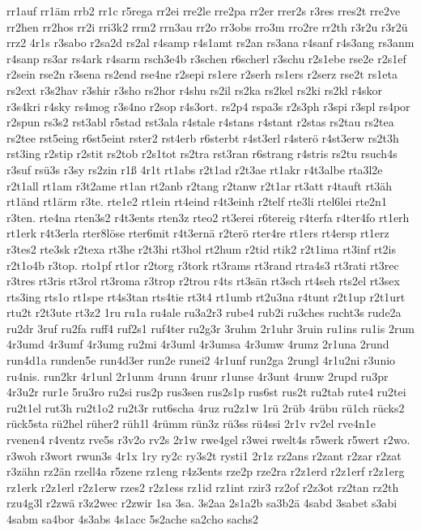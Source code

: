 {rr1auf
rr1äm
rrb2
rr1c
r5rega
rr2ei
rre2le
rre2pa
rr2er
rrer2s
r3res
rres2t
rre2ve
rr2hen
rr2hos
rr2i
rri3k2
rrm2
rrn3au
rr2o
rr3obs
rro3m
rro2re
rr2th
r3r2u
r3r2ü
rrz2
4r1s
r3sabo
r2sa2d
rs2al
r4samp
r4s1amt
rs2an
rs3ana
r4sanf
r4s3ang
rs3anm
r4sanp
rs3ar
rs4ark
r4sarm
rsch3e4b
r3schen
r6scherl
r3schu
r2s1ebe
rse2e
r2s1ef
r2sein
rse2n
r3sena
rs2end
rse4ne
r2sepi
rs1ere
r2serh
rs1ers
r2serz
rse2t
rs1eta
rs2ext
r3s2hav
r3shir
r3sho
rs2hor
r4shu
rs2il
rs2ka
rs2kel
rs2ki
rs2kl
r4skor
r3s4kri
r4sky
rs4mog
r3s4no
r2sop
r4s3ort.
rs2p4
rspa3s
r2s3ph
r3spi
r3spl
rs4por
r2spun
rs3s2
rst3abl
r5stad
rst3ala
r4stale
r4stans
r4stant
r2stas
rs2tau
rs2tea
rs2tee
rst5eing
r6st5eint
rster2
rst4erb
r6sterbt
r4st3erl
r4sterö
r4st3erw
rs2t3h
rst3ing
r2stip
r2stit
rs2tob
r2s1tot
rs2tra
rst3ran
r6strang
r4stris
rs2tu
rsuch4s
r3suf
rsü3s
r3sy
rs2zin
r1ß
4r1t
rt1abs
r2t1ad
r2t3ae
rt1akr
r4t3albe
rta3l2e
r2t1all
rt1am
r3t2ame
rt1an
rt2anb
r2tang
r2tanw
r2t1ar
rt3att
r4tauft
rt3äh
rt1änd
rt1ärm
r3te.
rte1e2
rt1ein
rt4eind
r4t3einh
r2telf
rte3li
rtel6lei
rte2n1
r3ten.
rte4na
rten3s2
r4t3ents
rten3z
rteo2
rt3erei
r6tereig
r4terfa
r4ter4fo
rt1erh
rt1erk
r4t3erla
rter8löse
rter6mit
r4t3ernä
r2terö
rter4re
rt1ers
rt4ersp
rt1erz
r3tes2
rte3sk
r2texa
rt3he
r2t3hi
rt3hol
rt2hum
r2tid
rtik2
r2t1ima
rt3inf
rt2is
r2t1o4b
r3top.
rto1pf
rt1or
r2torg
r3tork
rt3rams
rt3rand
rtra4s3
rt3rati
rt3rec
r3tres
rt3ris
rt3rol
rt3roma
r3trop
r2trou
r4ts
rt3sän
rt3sch
rt4seh
rts2el
rt3sex
rts3ing
rts1o
rt1spe
rt4s3tan
rts4tie
rt3t4
rt1umb
rt2u3na
r4tunt
r2t1up
r2t1urt
rtu2t
r2t3ute
rt3z2
1ru
ru1a
ru4ale
ru3a2r3
rube4
rub2i
ru3ches
rucht3s
rude2a
ru2dr
3ruf
ru2fa
ruff4
ruf2s1
ruf4ter
ru2g3r
3ruhm
2r1uhr
3ruin
ru1ins
ru1is
2rum
4r3umd
4r3umf
4r3umg
ru2mi
4r3uml
4r3umsa
4r3umw
4rumz
2r1una
2rund
run4d1a
runden5e
run4d3er
run2e
runei2
4r1unf
run2ga
2rungl
4r1u2ni
r3unio
ru4nis.
run2kr
4r1unl
2r1unm
4runn
4runr
r1unse
4r3unt
4runw
2rupd
ru3pr
4r3u2r
rur1e
5ru3ro
ru2si
rus2p
rus3sen
rus2s1p
rus6st
rus2t
ru2tab
rute4
ru2tei
ru2t1el
rut3h
ru2t1o2
ru2t3r
rut6scha
4ruz
ru2z1w
1rü
2rüb
4rübu
rü1ch
rücks2
rück5sta
rü2hel
rüher2
rüh1l
4rümm
rün3z
rü3ss
rü4ssi
2r1v
rv2el
rve4n1e
rvenen4
r4ventz
rve5s
r3v2o
rv2s
2r1w
rwe4gel
r3wei
rwelt4s
r5werk
r5wert
r2wo.
r3woh
r3wort
rwun3s
4r1x
1ry
ry2c
ry3s2t
rysti1
2r1z
rz2ans
r2zant
r2zar
r2zat
r3zähn
rz2än
rzell4a
r5zene
rz1eng
r4z3ents
rze2p
rze2ra
r2z1erd
r2z1erf
r2z1erg
rz1erk
r2z1erl
r2z1erw
rzes2
r2z1ess
rz1id
rz1int
rzir3
rz2of
r2z3ot
rz2tan
rz2th
rzu4g3l
r2zwä
r3z2wec
r2zwir
1sa
3sa.
3s2aa
2s1a2b
sa3b2ä
4sabd
3sabet
s3abi
4sabm
sa4bor
4s3abs
4s1acc
5s2ache
sa2cho
sachs2
}
